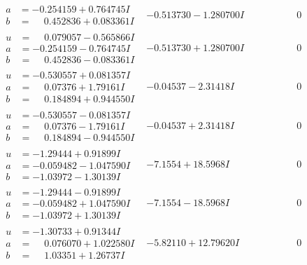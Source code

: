 \documentclass[1p]{elsarticle_modified}
\theoremstyle{definition}
\begin{document}
$$\begin{array}{c|c|c}
\begin{aligned}
a &= -0.254159 + 0.764745 I \\
b &= \phantom{-}0.452836 + 0.083361 I\end{aligned}
 & -0.513730 - 1.280700 I & \phantom{-0.000000 } 0 \\ \hline\begin{aligned}
u &= \phantom{-}0.079057 - 0.565866 I \\
a &= -0.254159 - 0.764745 I \\
b &= \phantom{-}0.452836 - 0.083361 I\end{aligned}
 & -0.513730 + 1.280700 I & \phantom{-0.000000 } 0 \\ \hline\begin{aligned}
u &= -0.530557 + 0.081357 I \\
a &= \phantom{-}0.07376 + 1.79161 I \\
b &= \phantom{-}0.184894 + 0.944550 I\end{aligned}
 & -0.04537 - 2.31418 I & \phantom{-0.000000 } 0 \\ \hline\begin{aligned}
u &= -0.530557 - 0.081357 I \\
a &= \phantom{-}0.07376 - 1.79161 I \\
b &= \phantom{-}0.184894 - 0.944550 I\end{aligned}
 & -0.04537 + 2.31418 I & \phantom{-0.000000 } 0 \\ \hline\begin{aligned}
u &= -1.29444 + 0.91899 I \\
a &= -0.059482 - 1.047590 I \\
b &= -1.03972 - 1.30139 I\end{aligned}
 & -7.1554 + 18.5968 I & \phantom{-0.000000 } 0 \\ \hline\begin{aligned}
u &= -1.29444 - 0.91899 I \\
a &= -0.059482 + 1.047590 I \\
b &= -1.03972 + 1.30139 I\end{aligned}
 & -7.1554 - 18.5968 I & \phantom{-0.000000 } 0 \\ \hline\begin{aligned}
u &= -1.30733 + 0.91344 I \\
a &= \phantom{-}0.076070 + 1.022580 I \\
b &= \phantom{-}1.03351 + 1.26737 I\end{aligned}
 & -5.82110 + 12.79620 I & \phantom{-0.000000 } 0 \\ \hline\begin{aligned}

\end{aligned}
\end{array}$$
\end{document}
